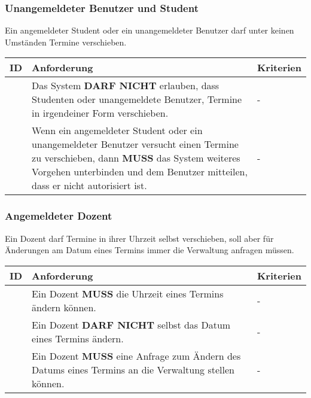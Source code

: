 \subsubsection{Unangemeldeter Benutzer und Student}
Ein angemeldeter Student oder ein unangemeldeter Benutzer darf unter keinen Umständen Termine verschieben.

\vspace{12pt}

\begin{tabular} {|p{}|p{}|p{}|}
	\hline
	ID & Anforderung & Kriterien \\
	\hline
	\printfreqnr
	& Das System \textbf{DARF NICHT} erlauben, dass Studenten oder unangemeldete Benutzer, Termine in irgendeiner Form verschieben. 
	& - \\
	\hline
	\printfreqnr
	& Wenn ein angemeldeter Student oder ein unangemeldeter Benutzer versucht einen Termine zu verschieben, dann \textbf{MUSS} das System weiteres Vorgehen unterbinden und dem Benutzer mitteilen, dass er nicht autorisiert ist.
	& - \\ 
	\hline
\end{tabular}

\vspace{12pt}

\subsubsection{Angemeldeter Dozent}

Ein Dozent darf Termine in ihrer Uhrzeit selbst verschieben, soll aber für Änderungen am Datum eines Termins immer die Verwaltung anfragen müssen.

\vspace{12pt}

\begin{tabular} {|p{}|p{}|p{}|}
	\hline
	ID & Anforderung & Kriterien \\
	\hline
	\printfreqnr
	& Ein Dozent \textbf{MUSS} die Uhrzeit eines Termins ändern können.
	& - \\
	\hline
	\printfreqnr
	& Ein Dozent \textbf{DARF NICHT} selbst das Datum eines Termins ändern.
	& - \\
	\hline
	\printfreqnr
	& Ein Dozent \textbf{MUSS} eine Anfrage zum Ändern des Datums eines Termins an die Verwaltung stellen können.
	& - \\
	\hline
\end{tabular}

\vspace{12pt}

